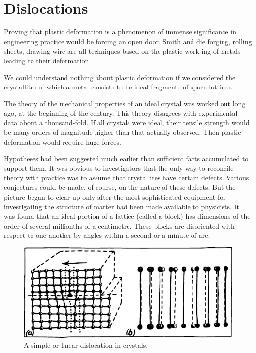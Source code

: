 \section{Dislocations}

Proving that plastic deformation is a phenomenon of immense significance in engineering practice would be forcing an open door. Smith and die forging, rolling sheets, drawing wire are all techniques based on the plastic work­ ing of metals leading to their deformation.

We could understand nothing about plastic deforma­tion if we considered the crystallites of which a metal con­sists to be ideal fragments of space lattices.

The theory of the mechanical properties of an ideal crystal was worked out long ago, at the beginning of the century. This theory disagrees with experimental data about a thousand-fold. If all crystals were ideal, their tensile strength would be many orders of magnitude high­er than that actually observed. Then plastic deformation would require huge forces.


Hypotheses had been suggested much earlier than sufficient facts accumulated to support them. It was obvious to investigators that the only way to reconcile theory with practice was to assume that crystallites have certain defects. Various conjectures could be made, of course, on the nature of these defects. But the picture began to clear up only after the most sophisticated equipment for investigating the structure of matter had been made available to physicists. It was found that an ideal portion of a lattice (called a block) has dimensions of the order of several millionths of a centimetre. These blocks are disoriented with respect to one another by angles within a second or a minute of arc.
\begin{figure}[!ht]
\centering
\includegraphics[width=\textwidth]{figures/fig-06-06.pdf}
\caption{A simple or linear dislocation in crystals.}
\label{fig-6.6}
\end{figure}

